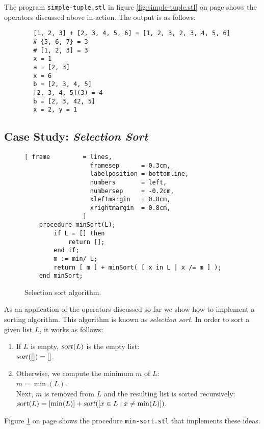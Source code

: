 The program  \texttt{simple-tuple.stl} in figure \ref{fig:simple-tuple.stl} on page
\pageref{fig:simple-tuple.stl} shows the operators discussed above in action.  The output
is as follows:
\begin{verbatim}
        [1, 2, 3] + [2, 3, 4, 5, 6] = [1, 2, 3, 2, 3, 4, 5, 6]
        # {5, 6, 7} = 3
        # [1, 2, 3] = 3
        x = 1
        a = [2, 3]
        x = 6
        b = [2, 3, 4, 5]
        [2, 3, 4, 5](3) = 4
        b = [2, 3, 42, 5]
        x = 2, y = 1
\end{verbatim}

\subsection{Case Study: \emph{Selection Sort}}
\begin{figure}[!ht]
\centering
\begin{Verbatim}[ frame         = lines, 
                  framesep      = 0.3cm, 
                  labelposition = bottomline,
                  numbers       = left,
                  numbersep     = -0.2cm,
                  xleftmargin   = 0.8cm,
                  xrightmargin  = 0.8cm,
                ]
    procedure minSort(L);
        if L = [] then 
            return []; 
        end if;
        m := min/ L;
        return [ m ] + minSort( [ x in L | x /= m ] );
    end minSort;
\end{Verbatim}
\vspace*{-0.3cm}
\caption{Selection sort algorithm.}
\label{fig:min-sort.stl}
\end{figure}

\noindent
As an application of the operators discussed so far we show how to implement a sorting algorithm.
This algorithm is known as \emph{selection sort}.  In order to sort a
given list $L$, it works as follows:
\begin{enumerate}
\item If  $L$ is empty,  $\textsl{sort}(L)$ is the empty list:
      \\[0.2cm]
      \hspace*{1.3cm}
      $\textsl{sort}([]) = []$.
\item Otherwise, we compute the minimum  $m$ of $L$: 
      \\[0.2cm]
      \hspace*{1.3cm}
      $m = \min(L)$.
      \\[0.2cm]
      Next,  $m$ is removed from $L$ and the resulting list is sorted recursively:
      \\[0.2cm]
      \hspace*{1.3cm}
      $\textsl{sort}(L) = [ \min(L) ] + \textsl{sort}([ x \in L \mid x \not= \min(L) ])$.
\end{enumerate}
Figure \ref{fig:min-sort.stl} on page \pageref{fig:min-sort.stl} shows the procedure 
\texttt{min-sort.stl} that implements these ideas. 



